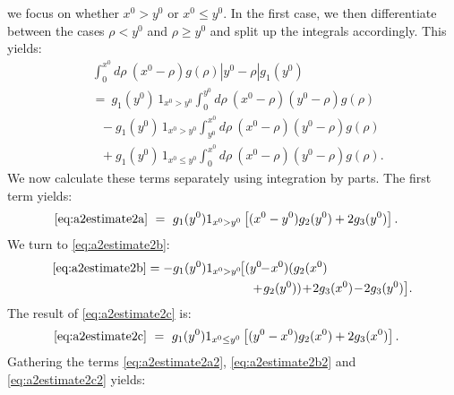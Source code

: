 \documentclass[b5paper,draft,openbib,12pt]{memoir}
\begin{document}
we focus on whether $x^0>y^0$ or $x^0\leq y^0$. In the first case, we then 
differentiate between the cases $\rho < y^0$ and $\rho \geq y^0$ and split 
up the integrals accordingly. This yields:
\begin{align}
	 &\int_0^{x^0} d \rho~(x^0-\rho) g(\rho) |y^0-\rho| g_1(y^0)\nonumber\\
&=~ g_1(y^0)\, 1_{x^0>y^0} \int_0^{y^0} d \rho~(x^0-\rho)(y^0-\rho) g(\rho)\label{eq:a2estimate2a}\\
&~~~ - g_1(y^0)\, 1_{x^0>y^0} \int_{y^0}^{x^0} d \rho~(x^0-\rho)(y^0-\rho) g(\rho)\label{eq:a2estimate2b}\\
& ~~~+ g_1(y^0)\, 1_{x^0\le y^0} \int_0^{x^0} d \rho~(x^0-\rho)(y^0-\rho) g(\rho).
\label{eq:a2estimate2c}
\end{align}
We now calculate these terms separately using integration by parts. The first 
term yields:
\begin{align}
	\eqref{eq:a2estimate2a} ~&=~ g_1(y^0) 1_{x^0>y^0} \left[ (x^0-y^0) g_2(y^0)+ 2g_3(y^0)\right].
\label{eq:a2estimate2a2}
\end{align}
We turn to \eqref{eq:a2estimate2b}:
\begin{align}\notag
  \eqref{eq:a2estimate2b} = -g_1(y^0) 1_{x^0>y^0}\!&\big[ (y^0\!\!-\!x^0)(g_2(x^0)\\
  &\quad \!+\!g_2(y^0))\!+\!2g_3(x^0) \!-\! 2g_3(y^0)\big].
\label{eq:a2estimate2b2}
\end{align}
The result of \eqref{eq:a2estimate2c} is:
\begin{align}
	\eqref{eq:a2estimate2c} ~&=~ g_1(y^0) 1_{x^0\le y^0} \left[ (y^0-x^0) g_2(x^0)+ 2g_3(x^0)\right].
	\label{eq:a2estimate2c2}
\end{align}
Gathering the terms \eqref{eq:a2estimate2a2}, \eqref{eq:a2estimate2b2} and 
\eqref{eq:a2estimate2c2} yields:
\end{document}
